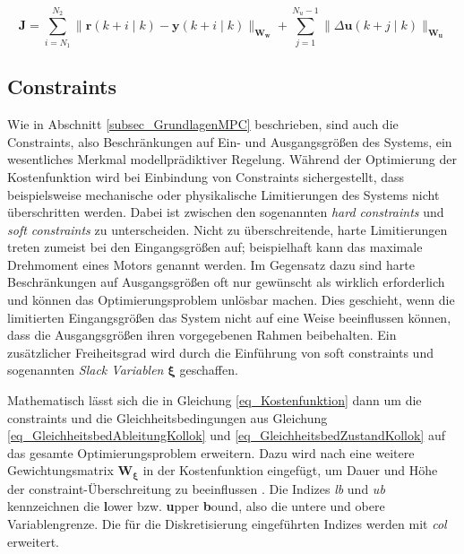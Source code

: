 \begin{equation} \label{eq_Kostenfunktion}
\boldsymbol{J}=\sum_{i=N_1}^{N_2}\|\boldsymbol{r}(k+i \mid k)-\boldsymbol{y}(k+i \mid k)\|_{\boldsymbol{W_w}}+\sum_{j=1}^{N_u-1}\|\Delta \boldsymbol{u}(k+j \mid k)\|_{\boldsymbol{W_u}}
\end{equation}


\subsection{Constraints} \label{subsec_Constraints}
Wie in Abschnitt \ref{subsec_GrundlagenMPC} beschrieben, sind auch die Constraints, also Beschränkungen auf Ein- und Ausgangsgrößen des Systems, ein wesentliches Merkmal modellprädiktiver Regelung.
Während der Optimierung der Kostenfunktion wird bei Einbindung von Constraints sichergestellt, dass beispielsweise mechanische oder physikalische Limitierungen des Systems nicht überschritten werden.
Dabei ist zwischen den sogenannten \textit{hard constraints} und \textit{soft constraints} zu unterscheiden.
Nicht zu überschreitende, harte Limitierungen treten zumeist bei den Eingangsgrößen auf; beispielhaft kann das maximale Drehmoment eines Motors genannt werden.
Im Gegensatz dazu sind harte Beschränkungen auf Ausgangsgrößen oft nur gewünscht als wirklich erforderlich und können das Optimierungsproblem unlösbar machen.
Dies geschieht, wenn die limitierten Eingangsgrößen das System nicht auf eine Weise beeinflussen können, dass die Ausgangsgrößen ihren vorgegebenen Rahmen beibehalten.
Ein zusätzlicher Freiheitsgrad wird durch die Einführung von soft constraints und sogenannten \textit{Slack Variablen} $\boldsymbol{\xi}$ geschaffen. \cite[S.4]{Schwenzer}

Mathematisch lässt sich die in Gleichung \ref{eq_Kostenfunktion} dann um die constraints und die Gleichheitsbedingungen aus Gleichung \ref{eq_GleichheitsbedAbleitungKollok} und \ref{eq_GleichheitsbedZustandKollok} auf das gesamte Optimierungsproblem erweitern.
Dazu wird nach \cite[S.4]{Schwenzer} eine weitere Gewichtungsmatrix $\boldsymbol{W_\xi}$ in der Kostenfunktion eingefügt, um Dauer und Höhe der constraint-Überschreitung zu beeinflussen \cite{Rawlings}.
Die Indizes \textit{lb} und \textit{ub} kennzeichnen die \textbf{l}ower bzw. \textbf{u}pper \textbf{b}ound, also die untere und obere Variablengrenze.
Die für die Diskretisierung eingeführten Indizes werden mit \textit{col} erweitert.

